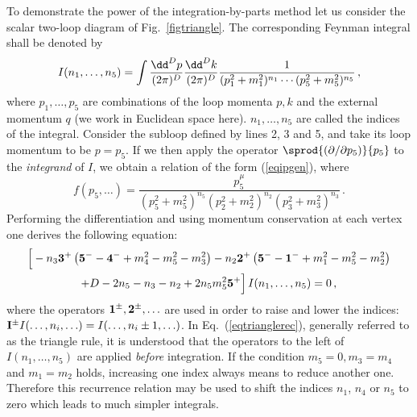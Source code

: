 To demonstrate the power of the integration-by-parts method let us
consider the scalar two-loop diagram of Fig.~\ref{figtriangle}.
The corresponding Feynman integral shall be denoted by
\begin{equation}
I(n_1,\ldots,n_5) = \int{\dd^D p\over (2\pi)^D}{\dd^D k\over (2\pi)^D}
{1\over (p_1^2 + m_1^2)^{n_1}\cdots(p_5^2+m_5^2)^{n_5}}\,,
\end{equation}
where $p_1,\ldots,p_5$ are combinations of the loop momenta $p,k$ and
the external momentum $q$ (we work in Euclidean space here).
$n_1,\ldots,n_5$ are called the indices of the integral.  Consider the
subloop defined by lines 2, 3 and 5, and take its loop momentum to be
$p=p_5$. If we then apply the operator $\sprod{(\partial/\partial
  p_5)}{p_5}$ to the {\it integrand} of $I$, we obtain a relation of the
form (\ref{eqipgen}), where
\begin{equation}
f(p_5,\ldots) = \frac{p_5^{\mu}}
  {(p_5^2+m_5^2)^{n_5} (p_2^2+m_2^2)^{n_2} (p_3^2+m_3^2)^{n_3}}
\,.
\end{equation}
Performing the differentiation and using momentum conservation at each
vertex one derives the following equation:
\begin{multline}
\Big[ 
    - n_3 {\bf 3^+}\left({\bf 5^-}-{\bf 4^-}+m_4^2-m_5^2-m_3^2\right)
    - n_2 {\bf 2^+}\left({\bf 5^-}-{\bf 1^-}+m_1^2-m_5^2-m_2^2\right)
\\
    + D-2n_5-n_3-n_2+2n_5 m_5^2 {\bf 5^+} 
\Big]\, I(n_1,\ldots,n_5) = 0
\,,
\label{eqtrianglerec}
\end{multline}
where the operators ${\bf 1^{\pm}}, {\bf 2^{\pm}}, \ldots$ are used in
order to raise and lower the indices: ${\bf I^{\pm}}I(\ldots,n_i,\ldots)
= I(\ldots,n_i\pm 1,\ldots)$.  In Eq.~(\ref{eqtrianglerec}), generally
referred to as the triangle rule, it is understood that the operators to
the left of $I(n_1,\ldots,n_5)$ are applied {\em before} integration.  If the
condition $m_5=0, m_3=m_4$ and $m_1=m_2$ holds, increasing one index
always means to reduce another one.  Therefore this recurrence relation
may be used to shift the indices $n_1$, $n_4$ or $n_5$ to zero which leads
to much simpler integrals.

